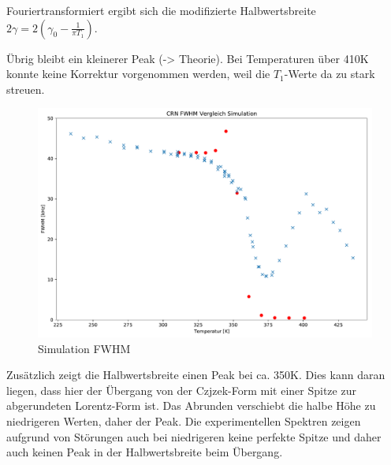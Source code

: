 Fouriertransformiert ergibt sich die modifizierte Halbwertsbreite $2\gamma = 2(\gamma_0 - \frac{1}{\pi T_1})$.

Übrig bleibt ein kleinerer Peak (-> Theorie). Bei Temperaturen über 410K konnte keine Korrektur vorgenommen werden, weil die $T_1$-Werte da zu stark streuen.

\begin{figure}
	\begin{center}
		\includegraphics[width=\textwidth]{graphics/plots/SIM/sim_fwhm.pdf}
	\end{center}
	\caption{Simulation FWHM} \label{fig:res:sim_fwhm}
\end{figure}
Zusätzlich zeigt die Halbwertsbreite einen Peak bei ca. 350K. Dies kann daran liegen, dass hier der Übergang von der Czjzek-Form mit einer Spitze zur abgerundeten Lorentz-Form ist. Das Abrunden verschiebt die halbe Höhe zu niedrigeren Werten, daher der Peak. Die experimentellen Spektren zeigen aufgrund von Störungen auch bei niedrigeren keine perfekte Spitze und daher auch keinen Peak in der Halbwertsbreite beim Übergang.





